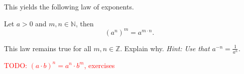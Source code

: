 This yields the following law of exponents.
\begin{tcolorbox}
	Let $a>0$ and $m,n\in\mathbb N$, then
	\begin{equation*}
		\left(a^n\right)^m=a^{m\cdot n}.
	\end{equation*}
\end{tcolorbox}
\begin{exercise}
	This law remains true for all $m,n\in\mathbb Z$.
	Explain why.
	\textit{Hint: Use that $a^{-n}=\frac{1}{a^n}$.}
\end{exercise}
\textcolor{red}{TODO: $\left(a\cdot b\right)^n=a^n\cdot b^m$, exercises}